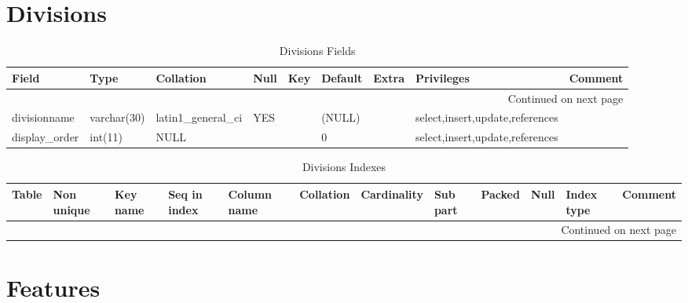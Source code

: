 \documentclass[tablesignature,landscape]{scrartcl}
\begin{document}
\section{Divisions}
\label{sec-2}


\begin{longtable}{|l|l|l|l|l|l|l|l|l|}
\caption{Divisions Fields} \label{tbl:divisionsfields}\\
\hline
 Field             &  Type         &  Collation                &  Null  &  Key  &  Default  &  Extra              &  Privileges                       &  Comment \\
\hline
\endhead
\hline\multicolumn{9}{r}{Continued on next page}\
\endfoot
\endlastfoot
\hline
 divisionid        &  int(11)      &  NULL                     &        &  PRI  &  (NULL)   &  auto\_{}increment  &  select,insert,update,references  &           \\
 divisionname      &  varchar(30)  &  latin1\_{}general\_{}ci  &  YES   &       &  (NULL)   &                     &  select,insert,update,references  &           \\
 display\_{}order  &  int(11)      &  NULL                     &        &       &  0        &                     &  select,insert,update,references  &           \\
\hline
\end{longtable}


\begin{longtable}{|l|l|l|l|l|l|l|l|l|l|l|l|}
\caption{Divisions Indexes} \label{tbl:Divisionsindexes}\\
\hline
 Table      &  Non unique  &  Key name  &  Seq in index  &  Column name  &  Collation  &  Cardinality  &  Sub part  &  Packed  &  Null  &  Index type  &  Comment \\
\hline
\endhead
\hline\multicolumn{12}{r}{Continued on next page}\
\endfoot
\endlastfoot
\hline
 Divisions  &           0  &  PRIMARY   &             1  &  divisionid   &  A          &            5  &  (NULL)    &  (NULL)  &        &  BTREE       &           \\
\hline
\end{longtable}
\section{Features}
\label{sec-3}
\end{document}
